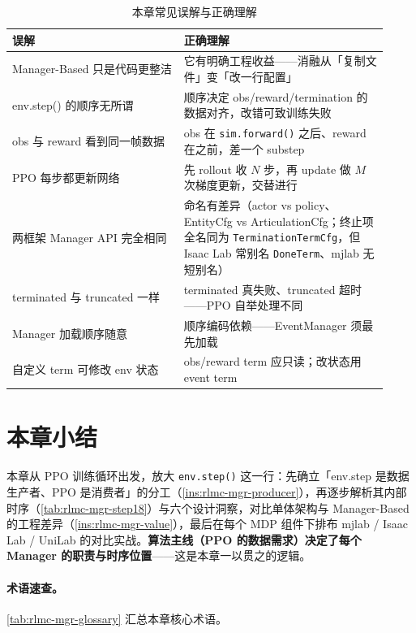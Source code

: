 \begin{table}[H]
\centering
\caption{本章常见误解与正确理解}
\label{tab:rlmc-mgr-misc}
\small
\begin{tabular}{@{}p{0.42\linewidth}p{0.5\linewidth}@{}}
\toprule
误解 & 正确理解 \\
\midrule
Manager-Based 只是代码更整洁 & 它有明确工程收益——消融从「复制文件」变「改一行配置」 \\
env.step() 的顺序无所谓 & 顺序决定 obs/reward/termination 的数据对齐，改错可致训练失败 \\
obs 与 reward 看到同一帧数据 & obs 在 \verb|sim.forward()| 之后、reward 在之前，差一个 substep \\
PPO 每步都更新网络 & 先 rollout 收 $N$ 步，再 update 做 $M$ 次梯度更新，交替进行 \\
两框架 Manager API 完全相同 & 命名有差异（actor vs policy、EntityCfg vs ArticulationCfg；终止项全名同为 \texttt{TerminationTermCfg}，但 Isaac Lab 常别名 \texttt{DoneTerm}、mjlab 无短别名） \\
terminated 与 truncated 一样 & terminated 真失败、truncated 超时——PPO 自举处理不同 \\
Manager 加载顺序随意 & 顺序编码依赖——EventManager 须最先加载 \\
自定义 term 可修改 env 状态 & obs/reward term 应只读；改状态用 event term \\
\bottomrule
\end{tabular}
\end{table}

\section*{本章小结}
\label{sec:rlmc-mgr-summary}

本章从 PPO 训练循环出发，放大 \verb|env.step()| 这一行：先确立「env.step 是数据生产者、PPO 是消费者」的分工（\cref{ins:rlmc-mgr-producer}），再逐步解析其内部时序（\cref{tab:rlmc-mgr-step18}）与六个设计洞察，对比单体架构与 Manager-Based 的工程差异（\cref{ins:rlmc-mgr-value}），最后在每个 MDP 组件下排布 mjlab / Isaac Lab / UniLab 的对比实战。\textbf{算法主线（PPO 的数据需求）决定了每个 Manager 的职责与时序位置}——这是本章一以贯之的逻辑。

\paragraph{术语速查。}\cref{tab:rlmc-mgr-glossary} 汇总本章核心术语。

